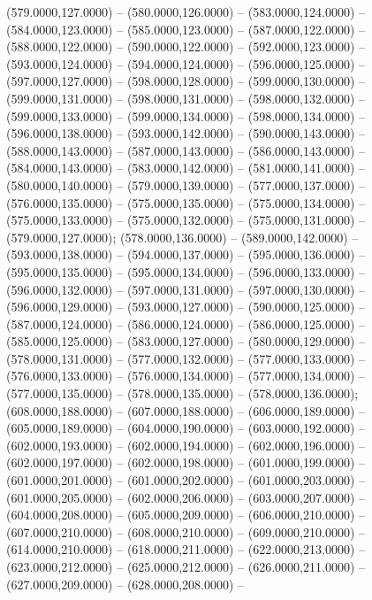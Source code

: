 \begin{scope}[draw=black,fill=cfdae61,line join=round,line width=0.208pt]
   (579.0000,127.0000) -- (580.0000,126.0000) --
    (583.0000,124.0000) -- (584.0000,123.0000) -- (585.0000,123.0000) --
    (587.0000,122.0000) -- (588.0000,122.0000) -- (590.0000,122.0000) --
    (592.0000,123.0000) -- (593.0000,124.0000) -- (594.0000,124.0000) --
    (596.0000,125.0000) -- (597.0000,127.0000) -- (598.0000,128.0000) --
    (599.0000,130.0000) -- (599.0000,131.0000) -- (598.0000,131.0000) --
    (598.0000,132.0000) -- (599.0000,133.0000) -- (599.0000,134.0000) --
    (598.0000,134.0000) -- (596.0000,138.0000) -- (593.0000,142.0000) --
    (590.0000,143.0000) -- (588.0000,143.0000) -- (587.0000,143.0000) --
    (586.0000,143.0000) -- (584.0000,143.0000) -- (583.0000,142.0000) --
    (581.0000,141.0000) -- (580.0000,140.0000) -- (579.0000,139.0000) --
    (577.0000,137.0000) -- (576.0000,135.0000) -- (575.0000,135.0000) --
    (575.0000,134.0000) -- (575.0000,133.0000) -- (575.0000,132.0000) --
    (575.0000,131.0000) -- (579.0000,127.0000);
   (578.0000,136.0000) -- (589.0000,142.0000) --
    (593.0000,138.0000) -- (594.0000,137.0000) -- (595.0000,136.0000) --
    (595.0000,135.0000) -- (595.0000,134.0000) -- (596.0000,133.0000) --
    (596.0000,132.0000) -- (597.0000,131.0000) -- (597.0000,130.0000) --
    (596.0000,129.0000) -- (593.0000,127.0000) -- (590.0000,125.0000) --
    (587.0000,124.0000) -- (586.0000,124.0000) -- (586.0000,125.0000) --
    (585.0000,125.0000) -- (583.0000,127.0000) -- (580.0000,129.0000) --
    (578.0000,131.0000) -- (577.0000,132.0000) -- (577.0000,133.0000) --
    (576.0000,133.0000) -- (576.0000,134.0000) -- (577.0000,134.0000) --
    (577.0000,135.0000) -- (578.0000,135.0000) -- (578.0000,136.0000);
   (608.0000,188.0000) -- (607.0000,188.0000) --
    (606.0000,189.0000) -- (605.0000,189.0000) -- (604.0000,190.0000) --
    (603.0000,192.0000) -- (602.0000,193.0000) -- (602.0000,194.0000) --
    (602.0000,196.0000) -- (602.0000,197.0000) -- (602.0000,198.0000) --
    (601.0000,199.0000) -- (601.0000,201.0000) -- (601.0000,202.0000) --
    (601.0000,203.0000) -- (601.0000,205.0000) -- (602.0000,206.0000) --
    (603.0000,207.0000) -- (604.0000,208.0000) -- (605.0000,209.0000) --
    (606.0000,210.0000) -- (607.0000,210.0000) -- (608.0000,210.0000) --
    (609.0000,210.0000) -- (614.0000,210.0000) -- (618.0000,211.0000) --
    (622.0000,213.0000) -- (623.0000,212.0000) -- (625.0000,212.0000) --
    (626.0000,211.0000) -- (627.0000,209.0000) -- (628.0000,208.0000) --

\end{scope}
